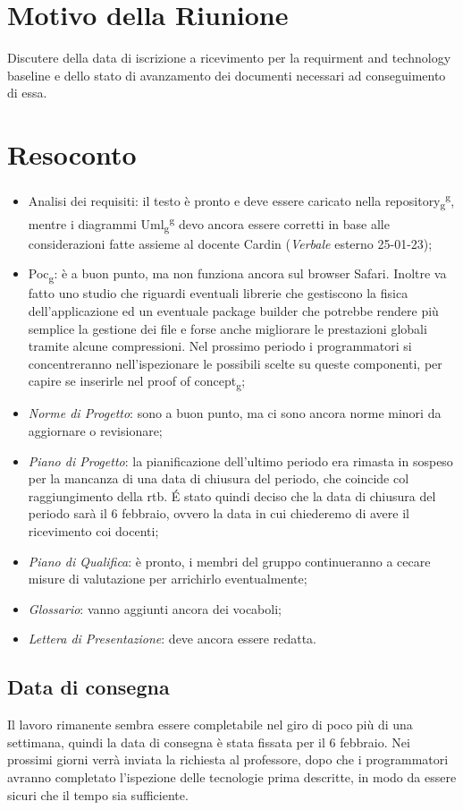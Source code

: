 \section{Motivo della Riunione}
Discutere della data di iscrizione a ricevimento per la requirment and technology baseline e dello stato di avanzamento dei documenti necessari ad conseguimento di essa.
\section{Resoconto}
\begin{itemize}
	\item Analisi dei requisiti: il testo è pronto e deve essere caricato nella repository\textsubscript{g}\textsuperscript{g}, mentre i diagrammi Uml\textsubscript{g}\textsuperscript{g} devo ancora essere corretti in base alle considerazioni fatte assieme al docente Cardin (\textit{Verbale} esterno 25-01-23);
	
	\item Poc\textsubscript{g}: è a buon punto, ma non funziona ancora sul browser Safari. Inoltre va fatto uno studio che riguardi eventuali librerie che gestiscono la fisica dell'applicazione ed un eventuale package builder che potrebbe rendere più semplice la gestione dei file e forse anche migliorare le prestazioni globali tramite alcune compressioni. Nel prossimo periodo i programmatori si concentreranno nell'ispezionare le possibili scelte su queste componenti, per capire se inserirle nel proof of concept\textsubscript{g};
	
	\item \textit{Norme di Progetto}: sono a buon punto, ma ci sono ancora norme minori da aggiornare o revisionare;
	
	\item \textit{Piano di Progetto}: la pianificazione dell'ultimo periodo era rimasta in sospeso per la mancanza di una data di chiusura del periodo, che coincide col raggiungimento della rtb. É stato quindi deciso che la data di chiusura del periodo sarà il 6 febbraio, ovvero la data in cui chiederemo di avere il ricevimento coi docenti;
	
	\item \textit{Piano di Qualifica}: è pronto, i membri del gruppo continueranno a cecare misure di valutazione per arrichirlo eventualmente;
	
	\item \textit{Glossario}: vanno aggiunti ancora dei vocaboli;

	\item \textit{Lettera di Presentazione}: deve ancora essere redatta.
\end{itemize}

\subsection{Data di consegna}
Il lavoro rimanente sembra essere completabile nel giro di poco più di una settimana, quindi la data di consegna è stata fissata per il 6 febbraio. 
\newline Nei prossimi giorni verrà inviata la richiesta al professore, dopo che i programmatori avranno completato l'ispezione delle tecnologie prima descritte, in modo da essere sicuri che il tempo sia sufficiente.
